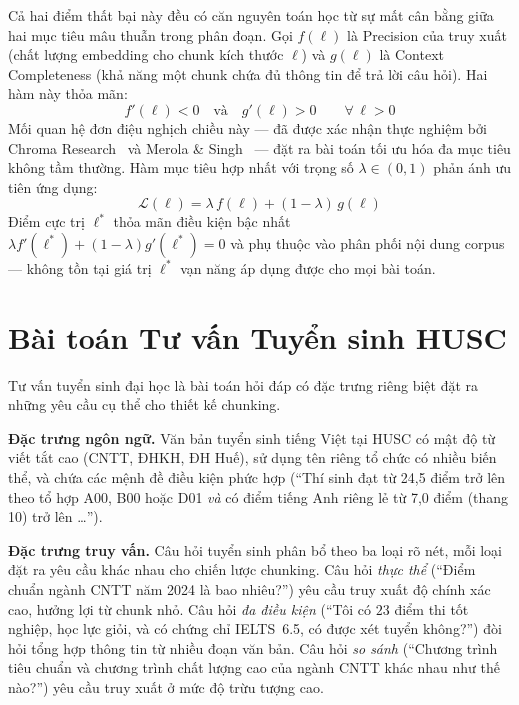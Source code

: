 \documentclass[12pt,a4paper]{report}
\theoremstyle{plain}
\theoremstyle{definition}
\begin{document}
	Cả hai điểm thất bại này đều có căn nguyên toán học từ sự mất cân bằng
	giữa hai mục tiêu mâu thuẫn trong phân đoạn. Gọi $f(\ell)$ là Precision
	của truy xuất (chất lượng embedding cho chunk kích thước $\ell$) và
	$g(\ell)$ là Context Completeness (khả năng một chunk chứa đủ thông tin
	để trả lời câu hỏi). Hai hàm này thỏa mãn:
	\begin{equation}
		f'(\ell) < 0 \quad \text{và} \quad g'(\ell) > 0
		\qquad \forall\, \ell > 0
		\label{eq:chunking_tradeoff}
	\end{equation}
	Mối quan hệ đơn điệu nghịch chiều này --- đã được xác nhận thực nghiệm
	bởi Chroma Research~\cite{chroma2024eval} và Merola \& Singh~\cite{merola2025reconstructing}
	--- đặt ra bài toán tối ưu hóa đa mục tiêu không tầm thường. Hàm mục tiêu
	hợp nhất với trọng số $\lambda \in (0,1)$ phản ánh ưu tiên ứng dụng:
	\begin{equation}
		\mathcal{L}(\ell) = \lambda\, f(\ell) + (1-\lambda)\, g(\ell)
		\label{eq:chunking_objective}
	\end{equation}
	Điểm cực trị $\ell^*$ thỏa mãn điều kiện bậc nhất
	$\lambda f'(\ell^*) + (1-\lambda)g'(\ell^*) = 0$ và phụ thuộc vào phân
	phối nội dung corpus --- không tồn tại giá trị $\ell^*$ vạn năng áp dụng
	được cho mọi bài toán.
	
	\section{Bài toán Tư vấn Tuyển sinh HUSC}
	\label{sec:husc_problem}
	
	Tư vấn tuyển sinh đại học là bài toán hỏi đáp có đặc trưng riêng biệt đặt
	ra những yêu cầu cụ thể cho thiết kế chunking.
	
	\textbf{Đặc trưng ngôn ngữ.} Văn bản tuyển sinh tiếng Việt tại HUSC có
	mật độ từ viết tắt cao (CNTT, ĐHKH, ĐH Huế), sử dụng tên riêng tổ chức
	có nhiều biến thể, và chứa các mệnh đề điều kiện phức hợp (``Thí sinh đạt
	từ 24,5 điểm trở lên theo tổ hợp A00, B00 hoặc D01 \emph{và} có điểm
	tiếng Anh riêng lẻ từ 7,0 điểm (thang 10) trở lên \ldots'').
	
	\textbf{Đặc trưng truy vấn.} Câu hỏi tuyển sinh phân bổ theo ba loại rõ
	nét, mỗi loại đặt ra yêu cầu khác nhau cho chiến lược chunking. Câu hỏi
	\emph{thực thể} (``Điểm chuẩn ngành CNTT năm 2024 là bao nhiêu?'') yêu
	cầu truy xuất độ chính xác cao, hưởng lợi từ chunk nhỏ. Câu hỏi
	\emph{đa điều kiện} (``Tôi có $23$ điểm thi tốt nghiệp, học lực giỏi, và
	có chứng chỉ IELTS~6.5, có được xét tuyển không?'') đòi hỏi tổng hợp
	thông tin từ nhiều đoạn văn bản. Câu hỏi \emph{so sánh} (``Chương trình
	tiêu chuẩn và chương trình chất lượng cao của ngành CNTT khác nhau như
	thế nào?'') yêu cầu truy xuất ở mức độ trừu tượng cao.
	
\end{document}
